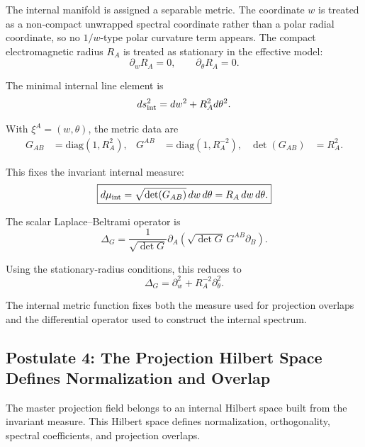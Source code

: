 \documentclass[11pt]{article}
\begin{document}
The internal manifold is assigned a separable metric. The coordinate \(w\) is treated as a non-compact unwrapped spectral coordinate rather than a polar radial coordinate, so no \(1/w\)-type polar curvature term appears. The compact electromagnetic radius \(R_A\) is treated as stationary in the effective model:
\begin{equation}
 \partial_wR_A=0,
\qquad
\partial_\theta R_A=0.
\end{equation}

The minimal internal line element is
\begin{equation}
ds_{\rm int}^2
=
dw^2
+
R_A^2d\theta^2.
\end{equation}

With \(\xi^A=(w,\theta)\), the metric data are
\begin{align}
G_{AB}
&=
\mathrm{diag}(1,R_A^2),
&
G^{AB}
&=
\mathrm{diag}(1,R_A^{-2}),
&
\det(G_{AB})
&=
R_A^2.
\end{align}

This fixes the invariant internal measure:
\begin{equation}
\boxed{
d\mu_{\rm int}
=
\sqrt{\det(G_{AB})}\,dw\,d\theta
=
R_A\,dw\,d\theta.
}
\end{equation}

The scalar Laplace--Beltrami \cite{Beltrami1868} operator is
\begin{equation}
\Delta_G
=
\frac{1}{\sqrt{\det G}}
\partial_A
\left(
\sqrt{\det G}\,
G^{AB}
\partial_B
\right).
\end{equation}

Using the stationary-radius conditions, this reduces to
\begin{equation}
\boxed{
\Delta_G
=
\partial_w^2
+
R_A^{-2}\partial_\theta^2.
}
\end{equation}

The internal metric function fixes both the measure used for projection overlaps and the differential operator used to construct the internal spectrum.

\subsection{Postulate 4: The Projection Hilbert Space Defines Normalization and Overlap}
\label{sec:postulate_projection_hilbert_space_normalization_overlap}

The master projection field belongs to an internal Hilbert space built from the invariant measure. This Hilbert space defines normalization, orthogonality, spectral coefficients, and projection overlaps.
\end{document}
